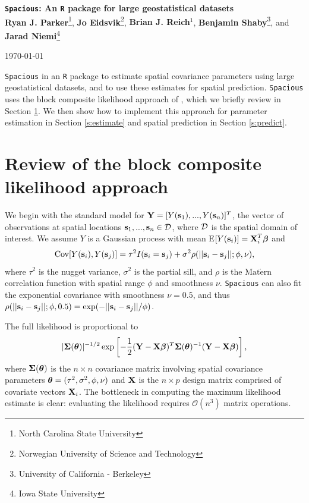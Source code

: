\documentclass[11pt]{article}
\newcommand{\btheta}{ \mbox{\boldmath $\theta$}}
\newcommand{\bbeta}{ \mbox{\boldmath $\beta$}}
\newcommand{\bSigma}{ \mbox{\boldmath $\Sigma$}}
\newcommand{\bX}{ \mbox{\bf X}}
\newcommand{\bY}{ \mbox{\bf Y}}
\newcommand{\bs}{ \mbox{\bf s}}
\newcommand{\calD}{{\cal D}}
\newcommand{\Matern}{ \mbox{Mat$\acute{\mbox{e}}$rn}}
\begin{document}
\linenumbers

\pagestyle{empty}
\begin{center}
{\Large {\bf  {\tt Spacious}: An {\tt R} package for large geostatistical datasets}}\\
\vspace{24pt}
\textbf{Ryan J. Parker}\footnote{North Carolina State University},
\textbf{Jo Eidsvik}\footnote{Norwegian University of Science and Technology},
\textbf{Brian J. Reich$^1$},
\textbf{Benjamin Shaby}\footnote{University of California - Berkeley}, and
\textbf{Jarad Niemi}\footnote{Iowa State University}
\vspace{24pt}

\today
\end{center}

{\tt Spacious} in an {\tt R} package to estimate spatial covariance parameters using large geostatistical datasets, and to use these estimates for spatial prediction.
{\tt Spacious} uses the block composite likelihood approach of \cite{Eidsvik:2013}, which we briefly review in Section \ref{s:review}.
We then show how to implement this approach for parameter estimation in Section \ref{s:estimate} and spatial prediction in Section \ref{s:predict}.

\section{Review of the block composite likelihood approach}\label{s:review}

We begin with the standard model for $\bY = [Y(\bs_1),...,Y(\bs_n)]^T$, the vector of observations at spatial locations $\bs_1,...,\bs_n\in \calD$, where $\calD$ is the spatial domain of interest.
We assume $Y$ is a Gaussian process with mean E$[Y(\bs_i)]=\bX_i^T\bbeta$ and $$\mbox{Cov}[Y(\bs_i),Y(\bs_j)]=\tau^2I(\bs_i=\bs_j) +\sigma^2\rho(||\bs_i-\bs_j||;\phi,\nu),$$
where $\tau^2$ is the nugget variance, $\sigma^2$ is the partial sill, and $\rho$ is the $\Matern$ correlation function with spatial range $\phi$ and smoothness $\nu$.
{\tt Spacious} can also fit the exponential covariance with smoothness $\nu=0.5$, and thus $\rho(||\bs_i-\bs_j||;\phi,0.5) = \exp(-||\bs_i-\bs_j||/\phi)$.

The full likelihood is proportional to
$$ |\bSigma(\btheta)|^{-1/2}\exp\left[-\frac{1}{2}(\bY-\bX\bbeta)^T\bSigma(\btheta)^{-1}(\bY-\bX\bbeta)\right],$$
where $\bSigma(\btheta)$ is the $n\times n$ covariance matrix involving spatial covariance parameters $\btheta = (\tau^2,\sigma^2,\phi,\nu)$ and $\bX$ is the $n\times p$ design matrix comprised of covariate vectors $\bX_i$.
The bottleneck in computing the maximum likelihood estimate is clear: evaluating the likelihood requires $\mathcal{O}(n^3)$ matrix operations.
\end{document}
